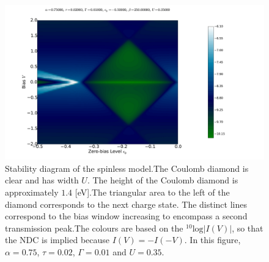 \begin{figure}[htb]
    \centering
    \includegraphics[height=.38\textheight]{pdf/coulombd/current_map_diamond_alpha_075.pdf}
    \caption{Stability diagram of the spinless model.The Coulomb diamond is clear and has width $U$. The height of the Coulomb diamond is approximately $1.4$ [eV].The triangular area to the left of the diamond corresponds to the next charge state. The distinct lines correspond to the bias window increasing to encompass a second transmission peak.The colours are based on the $^{10}\text{log}\left|I(V)\right|$, so that the NDC is implied because $I(V) = -I(-V)$. In this figure, $\alpha=0.75$, $\tau=0.02$, $\Gamma = 0.01$ and $U=0.35$.}
    \label{fig:diamond75}
\end{figure}

